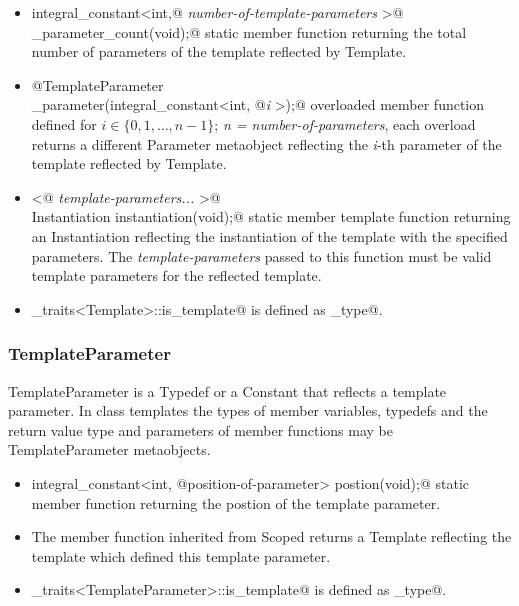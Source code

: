 \begin{itemize}

	\item{\verb@static integral_constant<int,@ {\em number-of-template-parameters}
	\verb@>@\\\verb@template_parameter_count(void);@} static member function returning the total number
	of parameters of the template reflected by {\metaobject Template}.

	\item{\verb@static @{\metaobject TemplateParameter}\\\verb@template_parameter(integral_constant<int, @{\em i}
	\verb@>);@} overloaded member function defined
	for $i \in \{0, 1, \dots, n-1\}$; {\em n = number-of-parameters},
	each overload returns a different {\metaobject Parameter} metaobject reflecting the {\em i}-th parameter
	of the template reflected by {\metaobject Template}.

	\item{\verb@template <@ {\em template-parameters...} \verb@>@\\
	\verb@static Instantiation instantiation(void);@} static member template function returning an {\metaobject Instantiation}
	reflecting the instantiation of the template with the specified parameters. The {\em template-parameters} passed
	to this function must be valid template parameters for the reflected template.

	\item \verb@metaobject_traits<Template>::is_template@ is defined as \verb@true_type@.
\end{itemize}

\subsubsection{TemplateParameter}

{\metaobject TemplateParameter} is a {\metaobject Typedef} or a {\metaobject Constant} that
reflects a template parameter. In class templates the types of member variables, typedefs and
the return value type and parameters of member functions may be {\metaobject TemplateParameter}
metaobjects.

\begin{itemize}
	\item{\verb@static integral_constant<int, @{\metaobject position-of-parameter}\verb@> postion(void);@}
	static member function returning the postion of the template parameter.

	\item The \verb@scope@ member function inherited from {\metaobject Scoped} returns a {\metaobject Template}
	reflecting the template which defined this template parameter.

	\item \verb@metaobject_traits<TemplateParameter>::is_template@ is defined as \verb@true_type@.
\end{itemize}

